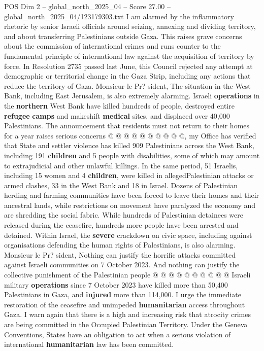 \begin{textsample}{POS Dim 2 – global\_north\_2025\_04 – Score 27.00 – global\_north\_2025\_04/123179303.txt}
I am alarmed by the inflammatory rhetoric by senior Israeli officials around seizing, annexing and dividing territory, and about transferring Palestinians outside Gaza.
This raises grave concerns about the commission of international crimes and runs counter to the fundamental principle of international law against the acquisition of territory by force.
In Resolution 2735 passed last June, this Council rejected any attempt at demographic or territorial change in the Gaza Strip, including any actions that reduce the territory of Gaza.
Monsieur le Pr? sident, The situation in the West Bank, including East Jerusalem, is also extremely alarming.
Israeli \textbf{operations} in the \textbf{northern} West Bank have killed hundreds of people, destroyed entire \textbf{refugee} \textbf{camps} and makeshift \textbf{medical} sites, and displaced over 40,000 Palestinians.
The announcement that residents must not return to their homes for a year raises serious concerns @ @ @ @ @ @ @ @ @ @, my Office has verified that State and settler violence has killed 909 Palestinians across the West Bank, including 191 \textbf{children} and 5 people with disabilities, some of which may amount to extrajudicial and other unlawful killings.
In the same period, 51 Israelis, including 15 women and 4 \textbf{children}, were killed in allegedPalestinian attacks or armed clashes, 33 in the West Bank and 18 in Israel.
Dozens of Palestinian herding and farming communities have been forced to leave their homes and their ancestral lands, while restrictions on movement have paralyzed the economy and are shredding the social fabric.
While hundreds of Palestinian detainees were released during the ceasefire, hundreds more people have been arrested and detained.
Within Israel, the \textbf{severe} crackdown on civic space, including against organisations defending the human rights of Palestinians, is also alarming.
Monsieur le Pr? sident, Nothing can justify the horrific attacks committed against Israeli communities on 7 October 2023.
And nothing can justify the collective punishment of the Palestinian people @ @ @ @ @ @ @ @ @ @ Israeli military \textbf{operations} since 7 October 2023 have killed more than 50,400 Palestinians in Gaza, and \textbf{injured} more than 114,000.
I urge the immediate restoration of the ceasefire and unimpeded \textbf{humanitarian} access throughout Gaza.
I warn again that there is a high and increasing risk that atrocity crimes are being committed in the Occupied Palestinian Territory.
Under the Geneva Conventions, States have an obligation to act when a serious violation of international \textbf{humanitarian} law has been committed.

\end{textsample}
